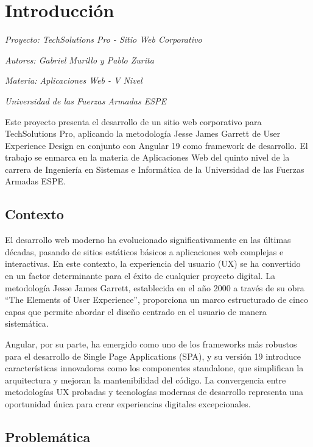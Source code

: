 \chapter{Introducción}
\label{cp:introduccion}

{
\parindent0pt

\textit{Proyecto: TechSolutions Pro - Sitio Web Corporativo}

\textit{Autores: Gabriel Murillo y Pablo Zurita}

\textit{Materia: Aplicaciones Web - V Nivel}

\textit{Universidad de las Fuerzas Armadas ESPE}

\vspace{.935em}

Este proyecto presenta el desarrollo de un sitio web corporativo para TechSolutions Pro, aplicando la metodología Jesse James Garrett de User Experience Design en conjunto con Angular 19 como framework de desarrollo. El trabajo se enmarca en la materia de Aplicaciones Web del quinto nivel de la carrera de Ingeniería en Sistemas e Informática de la Universidad de las Fuerzas Armadas ESPE.
}

\section{Contexto}

El desarrollo web moderno ha evolucionado significativamente en las últimas décadas, pasando de sitios estáticos básicos a aplicaciones web complejas e interactivas. En este contexto, la experiencia del usuario (UX) se ha convertido en un factor determinante para el éxito de cualquier proyecto digital. La metodología Jesse James Garrett, establecida en el año 2000 a través de su obra ``The Elements of User Experience'', proporciona un marco estructurado de cinco capas que permite abordar el diseño centrado en el usuario de manera sistemática.

Angular, por su parte, ha emergido como uno de los frameworks más robustos para el desarrollo de Single Page Applications (SPA), y su versión 19 introduce características innovadoras como los componentes standalone, que simplifican la arquitectura y mejoran la mantenibilidad del código. La convergencia entre metodologías UX probadas y tecnologías modernas de desarrollo representa una oportunidad única para crear experiencias digitales excepcionales.

\section{Problemática}

